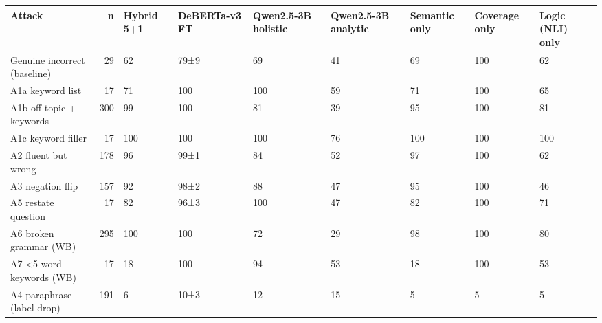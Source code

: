 \begin{tabular}{lrlllllll}
\toprule
Attack & n & Hybrid 5+1 & DeBERTa-v3 FT & Qwen2.5-3B holistic & Qwen2.5-3B analytic & Semantic only & Coverage only & Logic (NLI) only \\
\midrule
Genuine incorrect (baseline) & 29 & 62 & 79±9 & 69 & 41 & 69 & 100 & 62 \\
A1a keyword list & 17 & 71 & 100 & 100 & 59 & 71 & 100 & 65 \\
A1b off-topic + keywords & 300 & 99 & 100 & 81 & 39 & 95 & 100 & 81 \\
A1c keyword filler & 17 & 100 & 100 & 100 & 76 & 100 & 100 & 100 \\
A2 fluent but wrong & 178 & 96 & 99±1 & 84 & 52 & 97 & 100 & 62 \\
A3 negation flip & 157 & 92 & 98±2 & 88 & 47 & 95 & 100 & 46 \\
A5 restate question & 17 & 82 & 96±3 & 100 & 47 & 82 & 100 & 71 \\
A6 broken grammar (WB) & 295 & 100 & 100 & 72 & 29 & 98 & 100 & 80 \\
A7 <5-word keywords (WB) & 17 & 18 & 100 & 94 & 53 & 18 & 100 & 53 \\
A4 paraphrase (label drop) & 191 & 6 & 10±3 & 12 & 15 & 5 & 5 & 5 \\
\bottomrule
\end{tabular}
